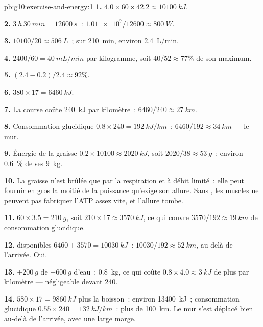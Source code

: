 \begin{solution}{pb:g10:exercise-and-energy:1}
\textbf{1.} $4.0 \times 60 \times 42.2 \approx \qty{10100}{kJ}$.

\textbf{2.} $\qty{3}{h}\,\qty{30}{min} = \qty{12600}{s}$~:
$\num{1.01e7}/12600 \approx \qty{800}{W}$.

\textbf{3.} $10100/20 \approx \qty{506}{L}$~; sur \qty{210}{min},
environ \qty{2.4}{L/min}.

\textbf{4.} $2400/60 = \qty{40}{mL/min}$ par kilogramme, soit $40/52
\approx 77\%$ de son maximum.

\textbf{5.} $(2.4 - 0.2)/2.4 \approx 92\%$.

\textbf{6.} $380 \times 17 = \qty{6460}{kJ}$.

\textbf{7.} La course coûte \qty{240}{kJ} par kilomètre~: $6460/240
\approx \qty{27}{km}$.

\textbf{8.} Consommation glucidique $0.8 \times 240 = \qty{192}{kJ/km}$~:
$6460/192 \approx \qty{34}{km}$ --- le mur.

\textbf{9.} Énergie de la graisse $0.2 \times 10100 \approx \qty{2020}{kJ}$,
soit $2020/38 \approx \qty{53}{g}$~: environ 0.6~\% de ses \qty{9}{kg}.

\textbf{10.} La graisse n'est brûlée que par la respiration et à débit
limité~: elle peut fournir en gros la moitié de la puissance qu'exige
son allure. Sans , les muscles ne peuvent pas fabriquer l'ATP
assez vite, et l'allure tombe.

\textbf{11.} $60 \times 3.5 = \qty{210}{g}$, soit $210 \times 17 \approx
\qty{3570}{kJ}$, ce qui couvre $3570/192 \approx \qty{19}{km}$ de
consommation glucidique.

\textbf{12.}  disponibles $6460 + 3570 = \qty{10030}{kJ}$~:
$10030/192 \approx \qty{52}{km}$, au-delà de l'arrivée. Oui.

\textbf{13.} $+\qty{200}{g}$ de  $+ \qty{600}{g}$ d'eau~:
\qty{0.8}{kg}, ce qui coûte $0.8 \times 4.0 \approx \qty{3}{kJ}$ de
plus par kilomètre --- négligeable devant 240.

\textbf{14.}  $580 \times 17 = \qty{9860}{kJ}$ plus la
boisson~: environ \qty{13400}{kJ}~; consommation glucidique
$0.55 \times 240 =
\qty{132}{kJ/km}$~: plus de \qty{100}{km}. Le mur s'est déplacé bien
au-delà de l'arrivée, avec une large marge.


\end{solution}
